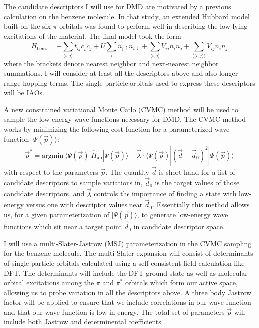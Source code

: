 \documentclass[12pt]{article}
\begin{document}
The candidate descriptors I will use for DMD are motivated by a previous calculation on the benzene molecule.
In that study, an extended Hubbard model built on the six $\pi$ orbitals was found to perform well in describing the low-lying excitations of the material.
The final model took the form 
\begin{equation}
H_\text{benz} = -\sum_{\langle i,j \rangle} t_{ij}c_i^\dagger c_j + U \sum_i n_{i\uparrow}n_{i\downarrow}  + \sum_{\langle i,j \rangle}V_{ij} n_i n_j + \sum_{\langle \langle i,j \rangle\rangle}V_{ij} n_i n_j
\label{Hbenz}
\end{equation}
where the brackets denote nearest neighbor and next-nearest neighbor summations.
I will consider at least all the descriptors above and also longer range hopping terms.
The single particle orbitals used to express these descriptors will be IAOs.

A new constrained variational Monte Carlo (CVMC) method will be used to sample the low-energy wave functions necessary for DMD.
The CVMC method works by minimizing the following cost function for a parameterized wave function $|\Psi(\vec{p})\rangle$:
\begin{equation}
\vec{p}^* = \text{argmin} \ \langle \Psi(\vec{p}) | \hat{H}_\text{ab} | \Psi(\vec{p}) \rangle - \vec{\lambda} \cdot \langle \Psi(\vec{p}) | (\vec{d} - \vec{d}_0)^2 | \Psi(\vec{p}) \rangle 
\end{equation}
with respect to the parameters $\vec{p}$.
The quantity $\vec{d}$ is short hand for a list of candidate descriptors to sample variations in, $\vec{d}_0$ is the target values of those candidate descriptors, and $\vec{\lambda}$ controls the importance of finding a state with low-energy versus one with descriptor values near $\vec{d}_0$.
Essentially this method allows us, for a given parameterization of $|\Psi(\vec{p})\rangle$, to generate low-energy wave functions which sit near a target point $\vec{d}_0$ in candidate descriptor space.

I will use a multi-Slater-Jastrow (MSJ) parameterization in the CVMC sampling for the benzene molecule.
The multi-Slater expansion will consist of determinants of single particle orbitals calculated using a self consistent field calculation like DFT.
The determinants will include the DFT ground state as well as molecular orbital excitations among the $\pi$ and $\pi^*$ orbitals which form our active space, allowing us to probe variation in all the descriptors above.
A three body Jastrow factor will be applied to ensure that we include correlations in our wave function and that our wave function is low in energy.
The total set of parameters $\vec{p}$ will include both Jastrow and determinental coefficients.
\end{document}

